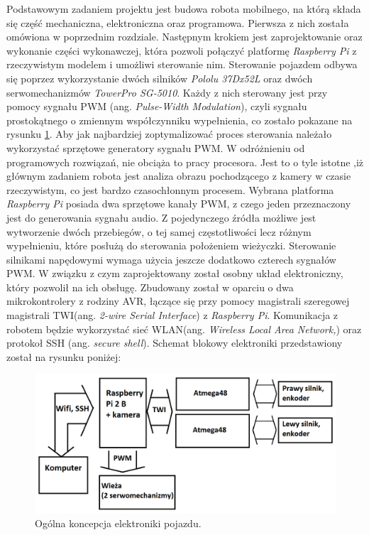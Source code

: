 Podstawowym zadaniem projektu jest budowa robota mobilnego, na którą składa się część mechaniczna, elektroniczna oraz programowa. Pierwsza z nich została omówiona w poprzednim rozdziale. Następnym krokiem jest zaprojektowanie oraz wykonanie części wykonawczej, która pozwoli połączyć platformę \textit{Raspberry Pi} z rzeczywistym modelem i umożliwi sterowanie nim. 
Sterowanie pojazdem odbywa się poprzez wykorzystanie dwóch silników \textit{Pololu 37Dx52L} oraz dwóch serwomechanizmów \textit{TowerPro SG-5010}. Każdy z nich sterowany jest przy pomocy sygnału PWM (ang. \textit{Pulse-Width Modulation}), czyli sygnału prostokątnego o zmiennym współczynniku wypełnienia, co zostało pokazane na rysunku \ref{sygnal_PWM}. Aby jak najbardziej zoptymalizować proces sterowania należało wykorzystać sprzętowe generatory sygnału PWM. W odróżnieniu od programowych rozwiązań, nie obciąża to pracy procesora. Jest to o tyle istotne ,iż głównym zadaniem robota jest analiza obrazu pochodzącego z kamery w czasie rzeczywistym, co jest bardzo czasochłonnym procesem. Wybrana platforma \textit{Raspberry Pi} posiada dwa sprzętowe kanały PWM, z czego jeden przeznaczony jest do generowania sygnału audio. Z pojedynczego źródła możliwe jest wytworzenie dwóch przebiegów, o tej samej częstotliwości lecz różnym wypełnieniu, które posłużą do sterowania położeniem wieżyczki. Sterowanie silnikami napędowymi wymaga użycia jeszcze dodatkowo czterech sygnałów PWM. W związku z czym zaprojektowany został osobny układ elektroniczny, który pozwolił na ich obsługę. Zbudowany został w oparciu o dwa mikrokontrolery z rodziny AVR, łączące się przy pomocy magistrali szeregowej magistrali TWI(ang. \textit{2-wire Serial Interface}) z \textit{Raspberry Pi}. Komunikacja z robotem będzie wykorzystać sieć WLAN(ang. \textit{Wireless Local Area Network,}) oraz protokoł SSH (ang. \textit{secure shell}). Schemat blokowy elektroniki przedstawiony został na rysunku poniżej:

  \begin{figure}[H]
    \begin{center}
      \includegraphics[scale=0.35]{imgs/idea.png}
 	\caption[Koncepcja elektroniki.]{\small{Ogólna koncepcja elektroniki pojazdu.}}
	\label{sygnal_PWM}
    \end{center}
  \end{figure}  
  
